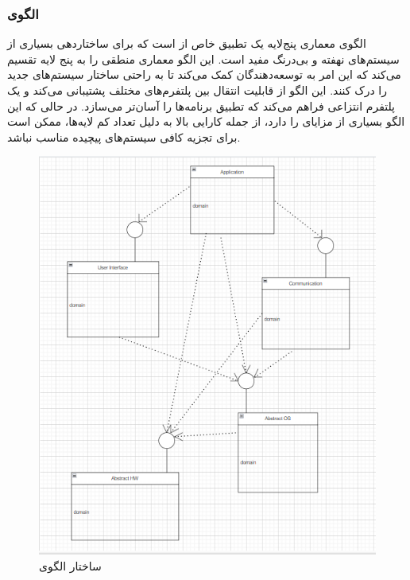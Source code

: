 \subsubsection{الگوی }
\label{arch5LayerSec}
\begin{RTL}
الگوی معماری پنج‌لایه \cite{ref4} یک تطبیق
خاص از  است
که برای ساختاردهی بسیاری از سیستم‌های نهفته و بی‌درنگ
مفید است. این الگو معماری منطقی را به پنج لایه
تقسیم می‌کند که این امر به توسعه‌دهندگان کمک می‌کند
تا به راحتی ساختار سیستم‌های جدید را درک کنند.
این الگو از قابلیت انتقال بین پلتفرم‌های مختلف پشتیبانی
می‌کند و یک پلتفرم انتزاعی فراهم می‌کند که تطبیق برنامه‌ها
را آسان‌تر می‌سازد. در حالی که این الگو بسیاری از
مزایای  را دارد، از جمله کارایی بالا به دلیل تعداد
کم لایه‌ها، ممکن است برای تجزیه کافی سیستم‌های پیچیده مناسب نباشد.
\end{RTL}
\begin{figure}[h!]
\centering
\includegraphics[scale=0.75]{images/first/5layer.png}
\caption{ساختار الگوی }
\end{figure}
